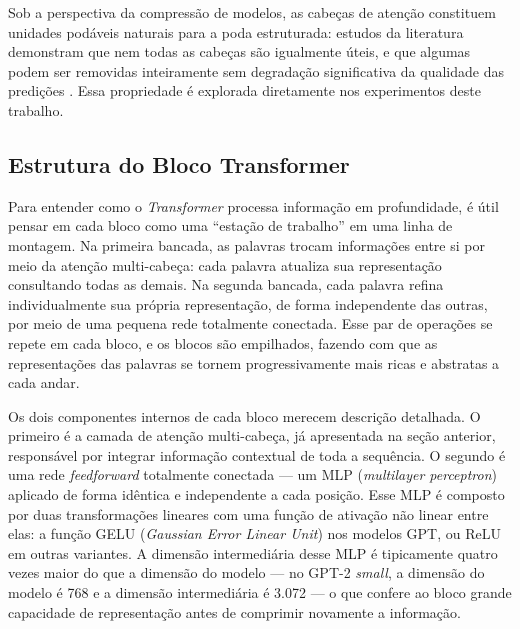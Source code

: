 Sob a perspectiva da compressão de modelos, as cabeças de atenção constituem unidades
podáveis naturais para a poda estruturada: estudos da literatura demonstram que nem todas
as cabeças são igualmente úteis, e que algumas podem ser removidas inteiramente sem
degradação significativa da qualidade das predições \cite{Michel2019}. Essa propriedade
é explorada diretamente nos experimentos deste trabalho.


\subsection{Estrutura do Bloco Transformer}\label{subsec:bloco_transformer}

Para entender como o \textit{Transformer} processa informação em profundidade, é útil
pensar em cada bloco como uma ``estação de trabalho'' em uma linha de montagem. Na
primeira bancada, as palavras trocam informações entre si por meio da atenção
multi-cabeça: cada palavra atualiza sua representação consultando todas as demais. Na
segunda bancada, cada palavra refina individualmente sua própria representação, de forma
independente das outras, por meio de uma pequena rede totalmente conectada.
Esse par de operações se repete em cada bloco, e os blocos são empilhados, fazendo com
que as representações das palavras se tornem progressivamente mais ricas e abstratas a
cada andar.

Os dois componentes internos de cada bloco merecem descrição detalhada. O primeiro é a
camada de atenção multi-cabeça, já apresentada na seção anterior, responsável por
integrar informação contextual de toda a sequência. O segundo é uma rede
\textit{feedforward} totalmente conectada --- um MLP (\textit{multilayer perceptron})
aplicado de forma idêntica e independente a cada posição. Esse MLP é composto por duas
transformações lineares com uma função de ativação não linear entre elas: a função GELU
(\textit{Gaussian Error Linear Unit}) nos modelos GPT, ou ReLU em outras variantes. A
dimensão intermediária desse MLP é tipicamente quatro vezes maior do que a dimensão
do modelo --- no GPT-2 \textit{small}, a dimensão do modelo é 768 e a dimensão
intermediária é 3.072 --- o que confere ao bloco grande capacidade de representação antes
de comprimir novamente a informação.

